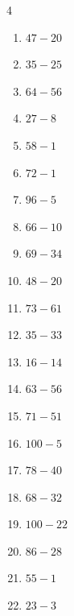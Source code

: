 \begin{multicols}{4}
\begin{enumerate}
  \item $47-20$
        \phantom{$=27$}

  \item $35-25$
        \phantom{$=10$}

  \item $64-56$
        \phantom{$=8$}

  \item $27-8$
        \phantom{$=19$}

  \item $58-1$
        \phantom{$=57$}

  \item $72-1$
        \phantom{$=71$}

  \item $96-5$
        \phantom{$=91$}

  \item $66-10$
        \phantom{$=56$}

  \item $69-34$
        \phantom{$=35$}

  \item $48-20$
        \phantom{$=28$}

  \item $73-61$
        \phantom{$=12$}

  \item $35-33$
        \phantom{$=2$}

  \item $16-14$
        \phantom{$=2$}

  \item $63-56$
        \phantom{$=7$}

  \item $71-51$
        \phantom{$=20$}

  \item $100-5$
        \phantom{$=95$}

  \item $78-40$
        \phantom{$=38$}

  \item $68-32$
        \phantom{$=36$}

  \item $100-22$
        \phantom{$=78$}

  \item $86-28$
        \phantom{$=58$}

  \item $55-1$
        \phantom{$=54$}

  \item $23-3$
        \phantom{$=20$}


\end{enumerate}
\end{multicols}

